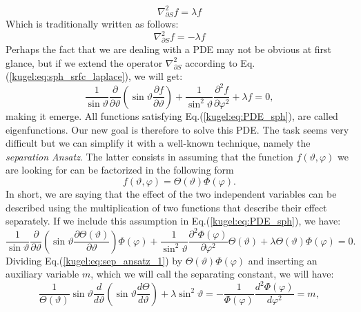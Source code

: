 \begin{equation}\label{kugel:eq:sph_srfc_laplace}
    \nabla^2_{\partial S} f = \lambda f 
\end{equation}
Which is traditionally written as follows:
\begin{equation*}
    \nabla^2_{\partial S} f = -\lambda f 
\end{equation*}
Perhaps the fact that we are dealing with a PDE may not be obvious at first glance, but if we extend the operator $\nabla^2_{\partial S}$ according to Eq.(\ref{kugel:eq:sph_srfc_laplace}), we will get:
\begin{equation}\label{kugel:eq:PDE_sph}
    \frac{1}{\sin\vartheta} \frac{\partial}{\partial \vartheta} \left( \sin\vartheta \frac{\partial f}{\partial\vartheta} \right)
                + \frac{1}{\sin^2 \vartheta} \frac{\partial^2 f}{\partial\varphi^2} + \lambda f = 0, 
\end{equation}
making it emerge.\newline
All functions satisfying Eq.(\ref{kugel:eq:PDE_sph}), are called eigenfunctions. Our new goal is therefore to solve this PDE. The task seems very difficult but we can simplify it with a well-known technique, namely the \emph{separation Ansatz}. The latter consists in assuming that the function $f(\vartheta, \varphi)$ we are looking for can be factorized in the following form 
\begin{equation}\label{kugel:eq:sep_ansatz_0}
    f(\vartheta, \varphi) = \Theta(\vartheta)\Phi(\varphi). 
\end{equation}
In short, we are saying that the effect of the two independent variables can be described using the multiplication of two functions that describe their effect separately. If we include this assumption in Eq.(\ref{kugel:eq:PDE_sph}), we have:
\begin{equation}
    \frac{1}{\sin\vartheta} \frac{\partial}{\partial \vartheta} \left( \sin\vartheta \frac{\partial  \Theta(\vartheta)}{\partial\vartheta} \right)\Phi(\varphi)
                + \frac{1}{\sin^2 \vartheta} \frac{\partial^2  \Phi(\varphi)}{\partial\varphi^2} \Theta(\vartheta) + \lambda  \Theta(\vartheta)\Phi(\varphi) = 0.  \label{kugel:eq:sep_ansatz_1}
\end{equation}
Dividing Eq.(\ref{kugel:eq:sep_ansatz_1}) by $\Theta(\vartheta)\Phi(\varphi)$ and inserting an auxiliary variable $m$, which we will call the separating constant, we will have:
\begin{equation*}
\frac{1}{\Theta(\vartheta)}\sin \vartheta \frac{d}{d \vartheta} \left( \sin \vartheta \frac{d \Theta}{d \vartheta} \right) + \lambda \sin^2 \vartheta = -\frac{1}{\Phi(\varphi)} \frac{d^2\Phi(\varphi)}{d\varphi^2} = m,
\end{equation*}
